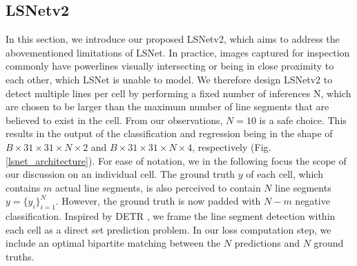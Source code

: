 \documentclass[journal]{IEEEtran}
\begin{document}
\subsection{LSNetv2}\label{lsnetv2_subsection}
In this section, we introduce our proposed LSNetv2, which aims to address the abovementioned limitations of LSNet.
In practice, images captured for inspection commonly have powerlines visually intersecting or being in close proximity to each other, which LSNet is unable to model.
We therefore design LSNetv2 to detect multiple lines per cell by performing a fixed number of inferences N, which are chosen to be larger than the maximum number of line segments that are believed to exist in the cell. From our observations, $N=10$ is a safe choice. This results in the output of the classification and regression being in the shape of $B \times 31 \times 31 \times N \times 2$ and $B \times 31 \times 31 \times N \times 4$, respectively (Fig. \ref{lsnet_architecture}). For ease of notation, we in the following focus the scope of our discussion on an individual cell. The ground truth $y$ of each cell, which contains $m$ actual line segments, is also perceived to contain $N$ line segments $y=\{y_i\}^N_{i=1}$. However, the ground truth is now padded with $N-m$ negative classification. Inspired by DETR \cite{DETR}, we frame the line segment detection within each cell as a direct set prediction problem. In our loss computation step, we include an optimal bipartite matching between the $N$ predictions and $N$ ground truths.
\end{document}

